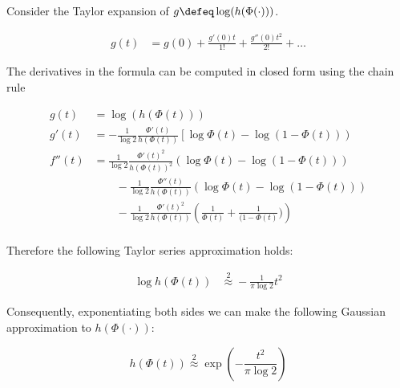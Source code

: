 Consider the Taylor expansion of $g \defeq \log(h(\Phi(\cdot)))$.

\begin{align}
	g(t) &= g(0) + \frac{g'(0)t}{1!} + \frac{g''(0)t^2}{2!} + \dots
\end{align}

The derivatives in the formula can be computed in closed form using the chain rule

\begin{align}
	g(t) &= \log(h(\Phi(t)))\\
	g'(t) &= -\frac{1}{\log 2}\frac{\Phi'(t)}{h(\Phi(t))}\left[\log\Phi(t) - \log(1-\Phi(t))  \right) \nonumber \\ 
	f''(t) &= \frac{1}{\log 2}\frac{\Phi'(t)^2}{h(\Phi(t))^2}\left(\log\Phi(t) - \log(1-\Phi(t))  \right)\nonumber\\
	& \qquad - \frac{1}{\log 2}\frac{\Phi''(t)}{h(\Phi(t))}\left(\log\Phi(t) - \log(1-\Phi(t))  \right) \nonumber\\
	& \qquad - \frac{1}{\log 2}\frac{\Phi'(t)^2}{h(\Phi(t))}\left(\frac{1}{\Phi(t)} + \frac{1}{(1-\Phi(t)})  \right) \nonumber\\
\end{align}

Therefore the following Taylor series approximation holds:

\begin{align}
	\log h(\Phi(t)) &\stackrel{2}{\approx} - \frac{1}{\pi\log 2}t^2
\end{align}

Consequently, exponentiating both sides we can make the following Gaussian approximation to $h(\Phi(\cdot))$:

\begin{equation}
	h(\Phi(t))\stackrel{2}{\approx}\exp\left({-\frac{t^2}{\pi\log 2}}\right)
\end{equation}

